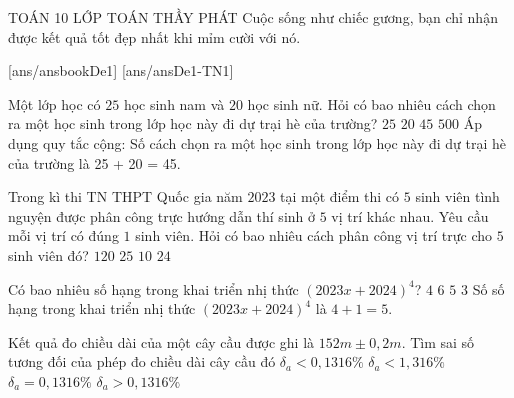 \begin{name}
	{\tenchude}
	{TOÁN 10}
	{LỚP TOÁN THẦY PHÁT}
	{Cuộc sống như chiếc gương, bạn chỉ nhận được kết quả tốt đẹp nhất khi mỉm cười với nó.}
\end{name}
[ans/ansbookDe1]
\TN
{}[ans/ansDe1-TN1]
\begin{ex}%
Một lớp học có $25$ học sinh nam và $20$ học sinh nữ. Hỏi có bao nhiêu cách chọn ra một học sinh trong lớp học này đi dự trại hè của trường?
\choice
{$25$}
{$20$}
{\True$45$}
{$500$}
\loigiai
{
Áp dụng quy tắc cộng:
Số cách chọn ra một học sinh trong lớp học này đi dự trại hè của trường là 25 + 20 = 45.
}
\end{ex}

\begin{ex}%
Trong kì thi TN THPT Quốc gia năm $2023$ tại một điểm thi có $5$ sinh viên tình nguyện được phân công trực hướng dẫn thí sinh ở $5$ vị trí khác nhau. Yêu cầu mỗi vị trí có đúng $1$ sinh viên. Hỏi có bao nhiêu cách phân công vị trí trực cho $5$ sinh viên đó?
\choice
{\True $120$}
{$25$}
{$10$}
{$24$}
\end{ex}

\begin{ex}%
Có bao nhiêu số hạng trong khai triển nhị thức $(2023x+2024)^4$?
\choice
{$4$}
{$6$}
{\True $5$}
{$3$}
\loigiai
{
Số số hạng trong khai triển nhị thức $(2023x+2024)^4$ là $4+1=5$.
}
\end{ex}

\begin{ex}%
	Kết quả đo chiều dài của một cây cầu được ghi là $152m\pm 0,2m$. Tìm sai số tương đối của phép đo chiều dài cây cầu đó
	\choice
	{\True $\delta_a<0,1316\%$}
	{$\delta_a<1,316\%$}
	{$\delta_a=0,1316\%$}
	{$\delta_a>0,1316\%$}
\end{ex}

